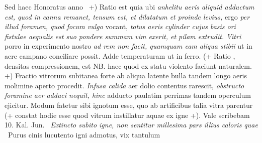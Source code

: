 Sed haec
Honoratus\protect{}
anno ~+) Ratio est quia ubi \textit{anhelitu aeris
aliquid adductum est, quod in canna remanet, tensum est, et dilatatum et proinde levius,} ergo \textit{per illud foramen, quod focum vulgo} vocant, \textit{totus aeris
cylinder cujus basis ori fistulae aequalis est suo pondere summam vim exerit, et pilam extrudit. Vitri\protect{} } porro in experimento nostro \textit{ad rem non facit, quamquam eam aliqua stibii\protect{} } ut in aere campano conciliare possit. Adde temperaturam ut in ferro\protect{}. (+ Ratio  , densitas compressionem, est NB. haec quod ex statu violento faciunt naturalem. +) Fractio vitrorum\protect{} subitanea forte ab aliqua latente bulla tandem longo aeris molimine aperto procedit. \textit{Infusa calida} aer dolio contentus rarescit, \textit{obstructo foramine aer adduci nequit, hinc} adducto paulatim perrimas tandem operculum ejicitur. Modum fatetur sibi ignotum esse, quo ab artificibus talia vitra parentur (+ constat hodie esse quod vitrum instillatur aquae ex igne +). Vale scribebam 10. Kal. Jun. 
\pend 
\pstart {} \,
\textit{Extincto subito igne, non sentitur millesima pars illius caloris quae }
\pend 
\pstart {} \, Purus cinis\protect{} lucutento igni admotus, vix tantulum 
\pend
